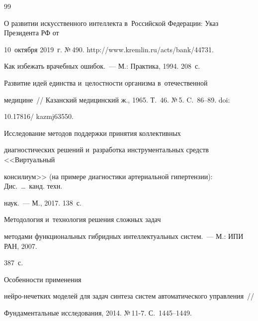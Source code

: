 {\small\frenchspacing

{%


\begin{thebibliography}{99}


О развитии искусственного интеллекта в~Российской Федерации: Указ Президента РФ от 

10~октября 2019~г. №\,490. {\sf http://www.kremlin.ru/acts/bank/44731}.




 Как избежать врачебных ошибок.~--- М.: Практика, 1994. 208~с.




 Развитие идей единства и~целостности организма в~отечественной 

медицине~/\!\!/ Казанский медицинский ж., 1965. Т.~46. №\,5. C.~86--89. doi: 

10.17816\!/ kazmj63550.




 Исследование методов поддержки принятия коллективных 

диагностических решений и~разработка инструментальных средств <<Виртуальный 

консилиум>> (на примере диагностики артериальной гипертензии): Дис.\ \ldots\ канд. техн. 

наук.~--- М., 2017. 138~с.


 Методология и~технология решения сложных задач 

методами функциональных гибридных интеллектуальных сис\-тем.~--- М.: ИПИ РАН, 2007. 

387~с.


 Особенности применения  

ней\-ро-не\-чет\-ких моделей для задач синтеза систем автоматического управления~/\!\!/ 

Фундаментальные исследования, 2014. №\,11-7. С.~1445--1449.



\end{thebibliography}}}
